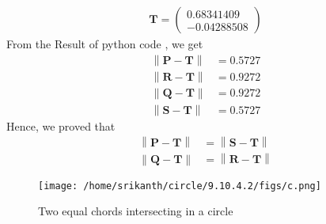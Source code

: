 \documentclass[12pt]{article}
\providecommand{\norm}[1]{\left\lVert#1\right\rVert}
\newcommand{\myvec}[1]{\ensuremath{\begin{pmatrix}#1\end{pmatrix}}}
\let\vec\mathbf
\begin{document}
\begin{align}
\vec{T}=\myvec{0.68341409\\-0.04288508}
\end{align}
From the Result of python code , we get
\begin{align}
\norm{\vec{P}-\vec{T}}&=0.5727\\
\norm{\vec{R}-\vec{T}}&=0.9272\\
\norm{\vec{Q}-\vec{T}}&=0.9272\\
\norm{\vec{S}-\vec{T}}&=0.5727
\end{align}
Hence, we proved that
\begin{align}
\norm{\vec{P}-\vec{T}}&=\norm{\vec{S}-\vec{T}}\\
\norm{\vec{Q}-\vec{T}}&=\norm{\vec{R}-\vec{T}}
\end{align} 
\begin{figure}[!h]
	\begin{center} 
	  \texttt{[image: /home/srikanth/circle/9.10.4.2/figs/c.png]}
	\end{center}
\caption{Two equal chords intersecting in a circle}
\label{fig:Fig1}
\end{figure}
\end{document}
